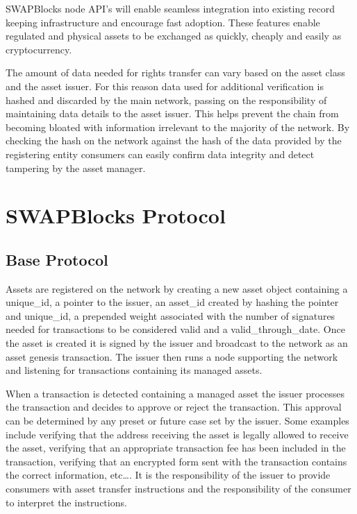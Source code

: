 \documentclass[12pt]{article}
\begin{document}
SWAPBlocks node API’s will enable seamless integration into 
existing record keeping infrastructure and encourage fast adoption. These 
features enable regulated and physical assets to be exchanged as quickly, cheaply
and easily as cryptocurrency.

The amount of data needed for rights transfer can vary based on the asset class
and the asset issuer.
For this reason data used for additional verification is hashed and discarded by the
main network, passing on the responsibility of maintaining data details to
the asset issuer. 
This helps prevent the chain from becoming bloated with information irrelevant 
to the majority of the network.  By checking the hash on the network against 
the hash of the data provided by the registering entity consumers can easily 
confirm data integrity and detect tampering by the asset manager.


\section{SWAPBlocks Protocol}
\subsection{Base Protocol}
Assets are registered on the network by creating a new asset object containing 
a unique\_id, a pointer to the issuer, an asset\_id created by hashing the pointer 
and unique\_id, a prepended weight associated with the number of signatures needed 
for transactions to be considered valid and a valid\_through\_date.  Once the asset 
is created it is signed by the issuer and broadcast to the network as an asset 
genesis transaction. The issuer then runs a node supporting the network and listening 
for transactions containing its managed assets.

When a transaction is detected containing a managed asset the issuer processes the 
transaction and decides to approve or reject the transaction.  This approval can be 
determined by any preset or future case set by the issuer.  Some examples include 
verifying that the address receiving the asset is legally allowed to receive the asset, 
verifying that an appropriate transaction fee has been included in the transaction, 
verifying that an encrypted form sent with the transaction contains the correct 
information, etc….  It is the responsibility of the issuer to provide consumers with 
asset transfer instructions and the responsibility of the consumer to interpret
the instructions.
\end{document}
